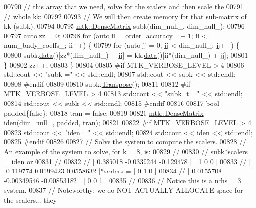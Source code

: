 \begin{DoxyCode}
{{00790   \textcolor{comment}{// this array that we need, solve for the scalers and then scale the}
00791   \textcolor{comment}{// whole kk:}
00792 
00793   \textcolor{comment}{// We will then create memory for that sub-matrix of kk (subk).}
00794 
00795   \hyperlink{classmtk_1_1DenseMatrix}{mtk::DenseMatrix} subk(dim\_null\_, dim\_null\_);
00796 
00797   \textcolor{keyword}{auto} zz = 0;
00798   \textcolor{keywordflow}{for} (\textcolor{keyword}{auto} ii = order\_accuracy\_ + 1; ii < num\_bndy\_coeffs\_; ii++) \{
00799     \textcolor{keywordflow}{for} (\textcolor{keyword}{auto} jj = 0; jj < dim\_null\_; jj++) \{
00800       subk.\hyperlink{classmtk_1_1DenseMatrix_a0c33b8a9e01d157c61ddbdf807c25d84}{data}()[zz*(dim\_null\_) + jj] = kk.\hyperlink{classmtk_1_1DenseMatrix_a0c33b8a9e01d157c61ddbdf807c25d84}{data}()[ii*(dim\_null\_) + jj];
00801     \}
00802     zz++;
00803   \}
00804 
00805 \textcolor{preprocessor}{  #if MTK\_VERBOSE\_LEVEL > 4}
00806   std::cout << \textcolor{stringliteral}{"subk ="} << std::endl;
00807   std::cout << subk << std::endl;
00808 \textcolor{preprocessor}{  #endif}
00809 
00810   subk.\hyperlink{classmtk_1_1DenseMatrix_a71d9c07ca66e88d97d1fd5012f43138b}{Transpose}();
00811 
00812 \textcolor{preprocessor}{  #if MTK\_VERBOSE\_LEVEL > 4}
00813   std::cout << \textcolor{stringliteral}{"subk\_t ="} << std::endl;
00814   std::cout << subk << std::endl;
00815 \textcolor{preprocessor}{  #endif}
00816 
00817   \textcolor{keywordtype}{bool} padded\{\textcolor{keyword}{false}\};
00818   tran = \textcolor{keyword}{false};
00819 
00820   \hyperlink{classmtk_1_1DenseMatrix}{mtk::DenseMatrix} iden(dim\_null\_, padded, tran);
00821 
00822 \textcolor{preprocessor}{  #if MTK\_VERBOSE\_LEVEL > 4}
00823   std::cout << \textcolor{stringliteral}{"iden ="} << std::endl;
00824   std::cout << iden << std::endl;
00825 \textcolor{preprocessor}{  #endif}
00826 
00827   \textcolor{comment}{// Solve the system to compute the scalers.}
00828   \textcolor{comment}{// An example of the system to solve, for k = 8, is:}
00829   \textcolor{comment}{//}
00830   \textcolor{comment}{// subk*scalers = iden or}
00831   \textcolor{comment}{//}
00832   \textcolor{comment}{// |  0.386018  -0.0339244   -0.129478 |           | 1 0 0 |}
00833   \textcolor{comment}{// | -0.119774   0.0199423   0.0558632 |*scalers = | 0 1 0 |}
00834   \textcolor{comment}{// | 0.0155708 -0.00349546 -0.00853182 |           | 0 0 1 |}
00835   \textcolor{comment}{//}
00836   \textcolor{comment}{// Notice this is a nrhs = 3 system.}
00837   \textcolor{comment}{// Noteworthy: we do NOT ACTUALLY ALLOCATE space for the scalers... they}
}}
\end{DoxyCode}
